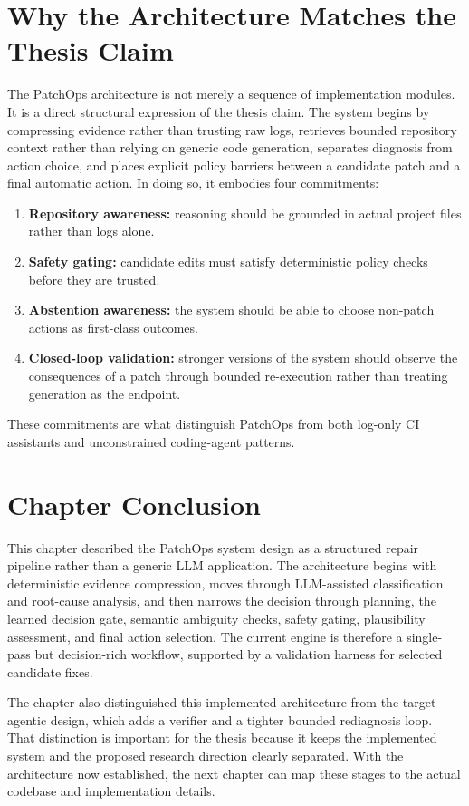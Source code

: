 \section{Why the Architecture Matches the Thesis Claim}

The PatchOps architecture is not merely a sequence of implementation modules. It is a direct structural
expression of the thesis claim. The system begins by compressing evidence rather than trusting raw logs,
retrieves bounded repository context rather than relying on generic code generation, separates diagnosis from
action choice, and places explicit policy barriers between a candidate patch and a final automatic action. In
doing so, it embodies four commitments:

\begin{enumerate}
\item \textbf{Repository awareness:} reasoning should be grounded in actual project files rather than logs alone.
\item \textbf{Safety gating:} candidate edits must satisfy deterministic policy checks before they are trusted.
\item \textbf{Abstention awareness:} the system should be able to choose non-patch actions as first-class
outcomes.
\item \textbf{Closed-loop validation:} stronger versions of the system should observe the consequences of a patch
through bounded re-execution rather than treating generation as the endpoint.
\end{enumerate}

These commitments are what distinguish PatchOps from both log-only CI assistants and unconstrained coding-agent
patterns.

\section{Chapter Conclusion}

This chapter described the PatchOps system design as a structured repair pipeline rather than a generic LLM
application. The architecture begins with deterministic evidence compression, moves through LLM-assisted
classification and root-cause analysis, and then narrows the decision through planning, the learned decision
gate, semantic ambiguity checks, safety gating, plausibility assessment, and final action selection. The current
engine is therefore a single-pass but decision-rich workflow, supported by a validation harness for selected
candidate fixes.

The chapter also distinguished this implemented architecture from the target agentic design, which adds a
verifier and a tighter bounded rediagnosis loop. That distinction is important for the thesis because it keeps
the implemented system and the proposed research direction clearly separated. With the architecture now
established, the next chapter can map these stages to the actual codebase and implementation details.
